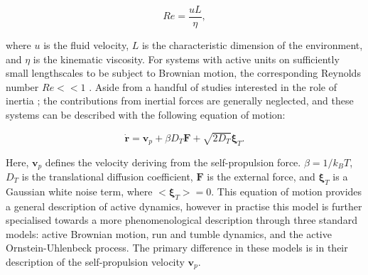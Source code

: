 \begin{equation}
	Re = \frac{u L}{\eta}, 
\end{equation}

\noindent where $u$ is the fluid velocity, $L$ is the characteristic dimension of the environment, and $\eta$ is the kinematic viscosity. For systems with active units on sufficiently small lengthscales to be subject to Brownian motion, the corresponding Reynolds number $Re<<1$ \cite{purcell2016}. Aside from a handful of studies interested in the role of inertia \cite{liao2021,nguyen2022,chatterjee2021}; the contributions from inertial forces are generally neglected, and these systems can be described with the following equation of motion:

 
\begin{equation}
    \dot{\mathbf{r}}=\mathbf{v}_{p} +\beta D_{T}\mathbf{F} +\sqrt{2D_{T}}\boldsymbol{\xi}_{T}.
    \label{eq:ABP3D_r}
\end{equation}

\noindent Here, $\mathbf{v}_p$ defines the velocity deriving from the self-propulsion force. $\beta = 1/k_B T$, $D_T$ is the translational diffusion coefficient, $\mathbf{F}$ is the external force, and $\boldsymbol{\xi}_{T}$ is a Gaussian white noise term, where $<\boldsymbol{\xi}_T>=0$. This equation of motion provides a general description of active dynamics, however in practise this model is further specialised towards a more phenomenological description through three standard models: active Brownian motion, run and tumble dynamics, and the active Ornstein-Uhlenbeck process. The primary difference in these models is in their description of the self-propulsion velocity $\mathbf{v}_p$. 



